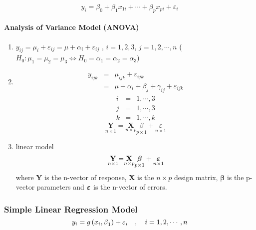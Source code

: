 \documentclass{article}
\begin{document}
\begin{equation*}
y_{i}=\beta _{0}+\beta _{1}x_{1i}+\cdots +\beta _{p}x_{pi}+\varepsilon _{i}
\end{equation*}

\paragraph{Analysis of Variance Model (ANOVA)}

\begin{enumerate}
\item $y_{ij}=\mu _{i}+\varepsilon _{ij}=\mu +\alpha _{i}+\varepsilon _{ij}$%
, $i=1,2,3$, $j=1,2,\cdots ,n$\newline
($H_{0}:\mu _{1}=\mu _{2}=\mu _{3}\Longleftrightarrow H_{0}=\alpha
_{1}=\alpha _{2}=\alpha _{3}$)

\item 
\begin{eqnarray*}
y_{ijk} &=&\mu _{ijk}+\varepsilon _{ijk} \\
&=&\mu +\alpha _{i}+\beta _{j}+\gamma _{ij}+\varepsilon _{ijk}
\end{eqnarray*}%
\begin{eqnarray*}
i &=&1,\cdots ,3 \\
j &=&1,\cdots ,3 \\
k &=&1,\cdots ,k
\end{eqnarray*}%
\begin{equation*}
\underset{n\times 1}{\mathbf{Y}}\mathbf{=}\underset{n\times p}{\mathbf{X}}%
\underset{p\times 1}{\beta }+\underset{n\times 1}{\varepsilon }
\end{equation*}

\item linear model%
\begin{equation*}
\underset{n\times 1}{\mathbf{Y}}\mathbf{=}\underset{n\times p}{\mathbf{X}}%
\underset{p\times 1}{\mathbf{\beta }}+\underset{n\times 1}{\mathbf{%
\varepsilon }}
\end{equation*}%
where $\mathbf{Y}$ is the n-vector of response, $\mathbf{X}$ is the $n\times
p$ design matrix, $\mathbf{\beta }$ is the p-vector parameters and $\mathbf{%
\varepsilon }$ is the n-vector of errors.
\end{enumerate}

\bigskip

\subsubsection{Simple Linear Regression Model%
\protect\begin{equation*}
y_{i}=g\left( x_{i},\protect\beta _{1}\right) +\protect\varepsilon _{i}\quad
,\quad i=1,2,\cdots ,n 
\protect\end{equation*}%
}
\end{document}
